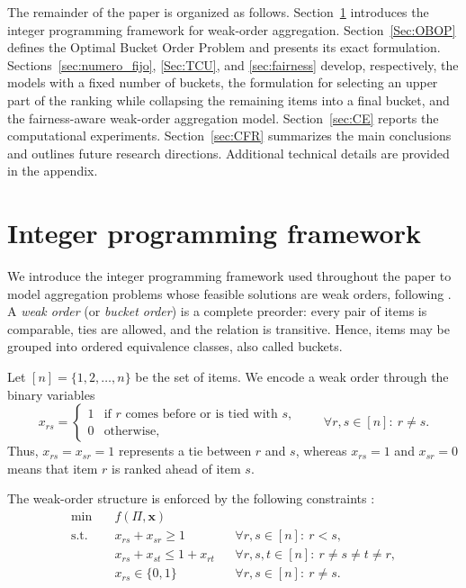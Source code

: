 \documentclass[pdflatex,basic,Numbered]{jnl}%
\theoremstyle{plain}
\theoremstyle{remark}
\theoremstyle{thmstyleone}%
\theoremstyle{thmstylethree}%
\begin{document}
The remainder of the paper is organized as follows. Section~\ref{sec:IPF} introduces the integer programming framework for weak-order aggregation. Section~\ref{Sec:OBOP} defines the Optimal Bucket Order Problem and presents its exact formulation. Sections~\ref{sec:numero_fijo}, \ref{Sec:TCU}, and \ref{sec:fairness} develop, respectively, the models with a fixed number of buckets, the formulation for selecting an upper part of the ranking while collapsing the remaining items into a final bucket, and the fairness-aware weak-order aggregation model. Section~\ref{sec:CE} reports the computational experiments. Section~\ref{sec:CFR} summarizes the main conclusions and outlines future research directions. Additional technical details are provided in the appendix.

\section{Integer programming framework} \label{sec:IPF}

We introduce the integer programming framework used throughout the paper to model aggregation problems whose feasible solutions are weak orders, following \cite{fiorini2004weak}. A \emph{weak order} (or \emph{bucket order}) is a complete preorder: every pair of items is comparable, ties are allowed, and the relation is transitive. Hence, items may be grouped into ordered equivalence classes, also called buckets.

Let \( [n]=\{1,2,\dots,n\} \) be the set of items. We encode a weak order through the binary variables
\[
x_{rs}=
\begin{cases}
1 & \text{if } r \text{ comes before or is tied with } s,\\
0 & \text{otherwise},
\end{cases}
\qquad \forall r,s\in [n]:\ r\neq s.
\]
Thus, \(x_{rs}=x_{sr}=1\) represents a tie between \(r\) and \(s\), whereas \(x_{rs}=1\) and \(x_{sr}=0\) means that item \(r\) is ranked ahead of item \(s\).

The weak-order structure is enforced by the following constraints \citep{brancotte2015rank,yoo2021new}:
\begin{subequations} \label{mod:empates}
    \begin{align} 
    \min\quad & f(\Pi,\bm{x}) \\
        \text{s.t.}\quad 
        & x_{rs}+x_{sr}\ge 1 
        && \forall r,s\in [n]:\ r<s, \label{eq:antes_o_despues_1} \\
        & x_{rs}+x_{st} \le 1+x_{rt}
        && \forall r,s,t\in [n]:\ r \neq s \neq t \neq r, \label{eq:transitividad_1} \\
        & x_{rs}\in\{0,1\}
        && \forall r,s\in [n]:\ r\neq s. \label{eq:naturaleza_x_1}
    \end{align}
\end{subequations}
\end{document}

